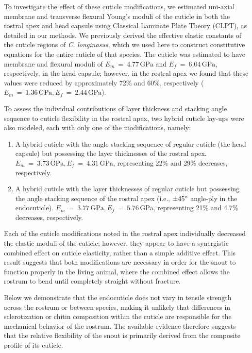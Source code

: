 \documentclass[twocolumn, linenumbers, superscriptaddress]{revtex4-1}
\begin{document}
		To investigate the effect of these cuticle modifications, we estimated uni-axial membrane and transverse flexural Young's moduli of the cuticle in both the rostral apex and head capsule using Classical Laminate Plate Theory (CLPT), as detailed in our methods.
		We previously derived the effective elastic constants of the cuticle regions of \textit{C. longinasus}, which we used here to construct constitutive equations for the entire cuticle of that species.
		The cuticle was estimated to have membrane and flexural moduli of $E_m~=~4.77\,\text{GPa}$ and $E_f~=~6.04\,\text{GPa}$, respectively, in the head capsule; however, in the rostral apex we found that these values were reduced by approximately 72\% and 60\%, respectively ($E_m~=~1.36\,\text{GPa}, E_f~=~2.44\,\text{GPa}$).
		
		To assess the individual contributions of layer thickness and stacking angle sequence to cuticle flexibility in the rostral apex, two hybrid cuticle lay-ups were also modeled, each with only one of the modifications, namely:
		\begin{enumerate}
			\item A hybrid cuticle with the angle stacking sequence of regular cuticle (the head capsule) but possessing the layer thicknesses of the rostral apex. $E_m~=~3.73\,\text{GPa}, E_f~=~4.31\,\text{GPa}$, representing 22\% and 29\% decreases, respectively.
			\item A hybrid cuticle with the layer thicknesses of regular cuticle but possessing the angle stacking sequence of the rostral apex (i.e., $\pm45\degree$ angle-ply in the endocuticle). $E_m~=~3.77\,\text{GPa}, E_f~=~5.76\,\text{GPa}$, representing 21\% and 4.7\% decreases, respectively.
		\end{enumerate}
		
		Each of the cuticle modifications noted in the rostral apex  individually decreased the elastic moduli of the cuticle; however, they appear to have a synergistic combined effect on cuticle elasticity, rather than a simple additive effect.
		This result suggests that both modifications are necessary in order for the snout to function properly in the living animal, where the combined effect allows the rostrum to bend until completely straight without fracture.
		
		Below we demonstrate that the endocuticle does not vary in tensile strength across the rostrum or between species, making it unlikely that differences in sclerotization or chitin composition within the cuticle are responsible for the mechanical behavior of the rostrum.
		The available evidence therefore suggests that the relative flexibility of the snout is primarily derived from the composite profile of its cuticle.
		
\end{document}
